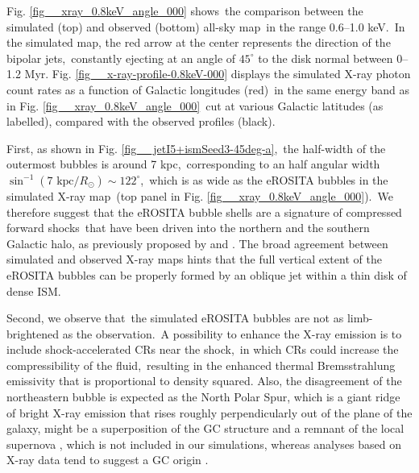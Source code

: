 \documentclass[fleqn,usenatbib,useAMS]{mnras}
\begin{document}
  Fig. \ref{fig__xray_0.8keV_angle_000} shows\
  the comparison between the simulated (top) and observed (bottom) all-sky map\
  in the range 0.6--1.0 keV.\
  In the simulated map, the red arrow at the center represents the direction of the bipolar jets,\
  constantly ejecting at an angle of $45^{\circ}$ to the disk normal between 0--1.2 Myr. Fig. \ref{fig__x-ray-profile-0.8keV-000} displays the simulated X-ray photon count rates as a function of Galactic longitudes (red)\
  in the same energy band as in Fig. \ref{fig__xray_0.8keV_angle_000}\
  cut at various Galactic latitudes (as labelled), compared with the observed profiles (black).


  First, as shown in Fig. \ref{fig__jetI5+ismSeed3-45deg-a},\
  the half-width of the outermost bubbles is around 7 kpc,\
  corresponding to an half angular width $\sin^{-1}(7 \text{ kpc}/R_{\odot})\sim122^{\circ}$,\
  which is as wide as the eROSITA bubbles in the simulated X-ray map\
  (top panel in Fig. \ref{fig__xray_0.8keV_angle_000}).\
  We therefore suggest that the eROSITA bubble shells are a signature of compressed forward shocks\
  that have been driven into the northern and the southern Galactic halo,
  as previously proposed by \citet{Predehl2020} and \citet{Yang2022}. The broad agreement between simulated and observed X-ray maps hints that the full vertical extent of the eROSITA bubbles can be properly formed by an oblique jet within a thin disk of dense ISM.

  Second, we observe that\
  the simulated eROSITA bubbles are not as limb-brightened as the observation.\
  A possibility to enhance the X-ray emission is to include shock-accelerated CRs near the shock,\
  in which CRs could increase the compressibility of the fluid,\
  resulting in the enhanced thermal Bremsstrahlung emissivity that is proportional to density squared. Also, the disagreement of the northeastern bubble is expected as the North Polar Spur, which is a giant ridge of bright X-ray emission that rises roughly perpendicularly out of the plane of the galaxy, might be a superposition of the GC structure and a remnant of the local supernova \citep{berkhuijsen1971galactic,Das2020,Panopoulou2021}, which is not included in our simulations, whereas analyses based on X-ray data tend to suggest a GC origin \citep{kataoka2018x,sofue2000bipolar,larocca2020analysis}.
\end{document}
